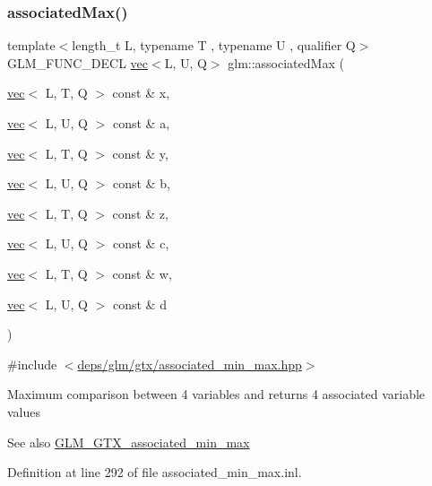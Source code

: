 \subsubsection{\texorpdfstring{associated\+Max()}{associatedMax()}\hspace{0.1cm}{\footnotesize\ttfamily [10/12]}}
{\footnotesize\ttfamily template$<$length\+\_\+t L, typename T , typename U , qualifier Q$>$ \\
G\+L\+M\+\_\+\+F\+U\+N\+C\+\_\+\+D\+E\+CL \hyperlink{structglm_1_1vec}{vec}$<$L, U, Q$>$ glm\+::associated\+Max (\begin{DoxyParamCaption}\item[{\hyperlink{structglm_1_1vec}{vec}$<$ L, T, Q $>$ const \&}]{x,  }\item[{\hyperlink{structglm_1_1vec}{vec}$<$ L, U, Q $>$ const \&}]{a,  }\item[{\hyperlink{structglm_1_1vec}{vec}$<$ L, T, Q $>$ const \&}]{y,  }\item[{\hyperlink{structglm_1_1vec}{vec}$<$ L, U, Q $>$ const \&}]{b,  }\item[{\hyperlink{structglm_1_1vec}{vec}$<$ L, T, Q $>$ const \&}]{z,  }\item[{\hyperlink{structglm_1_1vec}{vec}$<$ L, U, Q $>$ const \&}]{c,  }\item[{\hyperlink{structglm_1_1vec}{vec}$<$ L, T, Q $>$ const \&}]{w,  }\item[{\hyperlink{structglm_1_1vec}{vec}$<$ L, U, Q $>$ const \&}]{d }\end{DoxyParamCaption})}



{\ttfamily \#include $<$\hyperlink{associated__min__max_8hpp}{deps/glm/gtx/associated\+\_\+min\+\_\+max.\+hpp}$>$}

Maximum comparison between 4 variables and returns 4 associated variable values \begin{DoxySeeAlso}{See also}
\hyperlink{group__gtx__associated__min__max}{G\+L\+M\+\_\+\+G\+T\+X\+\_\+associated\+\_\+min\+\_\+max} 
\end{DoxySeeAlso}


Definition at line 292 of file associated\+\_\+min\+\_\+max.\+inl.

